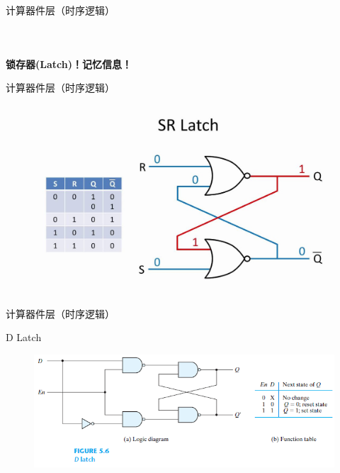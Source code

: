 \documentclass{myslide}
\begin{document}
\begin{frame}{计算器件层（时序逻辑）}
\begin{columns}
\begin{column}{0.5\linewidth}
\begin{figure}
\begin{tabular}{c}
\end{tabular}
\end{figure}
\end{column}
\end{columns}
\pause
\begin{center}
\Large\textbf{锁存器(Latch)！记忆信息！}
\end{center}
\end{frame}

\begin{frame}{计算器件层（时序逻辑）}
\begin{figure}
\centering
\includegraphics[width=0.8\linewidth]{fig/Lecture2/sr-latch.jpg}
\end{figure}
\end{frame}

\begin{frame}{计算器件层（时序逻辑）}
\begin{center}
\large D Latch
\end{center}
\begin{figure}
\centering
\includegraphics[width=0.9\linewidth]{fig/Lecture2/d-latch.png}
\end{figure}
\end{frame}
\end{document}
